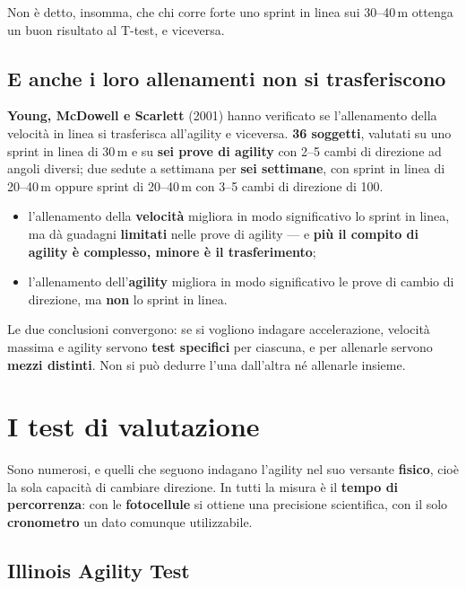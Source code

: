 Non è detto, insomma, che chi corre forte uno sprint in linea sui 30--40\,m ottenga un buon
risultato al T-test, e viceversa.

\subsection{E anche i loro allenamenti non si trasferiscono}

\textbf{Young, McDowell e Scarlett} (2001) hanno verificato se l'allenamento della velocità in
linea si trasferisca all'agility e viceversa. \textbf{36 soggetti}, valutati su uno sprint in linea
di 30\,m e su \textbf{sei prove di agility} con 2--5 cambi di direzione ad angoli diversi; due
sedute a settimana per \textbf{sei settimane}, con sprint in linea di 20--40\,m oppure sprint di
20--40\,m con 3--5 cambi di direzione di 100\textdegree.

\begin{itemize}
  \item l'allenamento della \textbf{velocità} migliora in modo significativo lo sprint in linea, ma
    dà guadagni \textbf{limitati} nelle prove di agility --- e \textbf{più il compito di agility è
    complesso, minore è il trasferimento};
  \item l'allenamento dell'\textbf{agility} migliora in modo significativo le prove di cambio di
    direzione, ma \textbf{non} lo sprint in linea.
\end{itemize}

Le due conclusioni convergono: se si vogliono indagare accelerazione, velocità massima e agility
servono \textbf{test specifici} per ciascuna, e per allenarle servono \textbf{mezzi distinti}. Non
si può dedurre l'una dall'altra né allenarle insieme.

\section{I test di valutazione}

Sono numerosi, e quelli che seguono indagano l'agility nel suo versante \textbf{fisico}, cioè la
sola capacità di cambiare direzione. In tutti la misura è il \textbf{tempo di percorrenza}: con le
\textbf{fotocellule} si ottiene una precisione scientifica, con il solo \textbf{cronometro} un dato
comunque utilizzabile.

\subsection{Illinois Agility Test}

